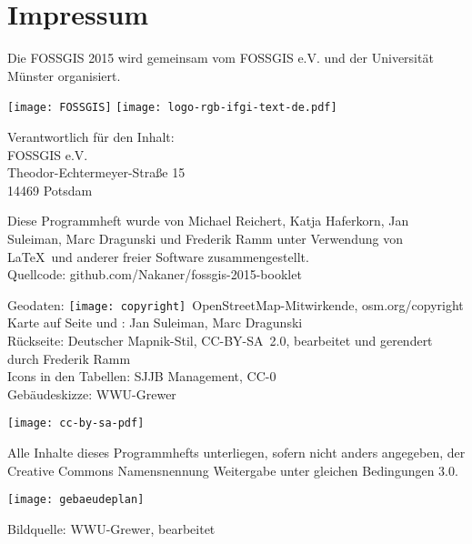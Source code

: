 
\newpage


\newpage
\section*{Impressum}
\label{impressum}
\vspace{-0.5em}


\RaggedRight
Die FOSSGIS 2015 wird gemeinsam vom FOSSGIS e.V. und der Universität Münster 
organisiert.

\vspace{0.5em}
	\texttt{[image: FOSSGIS]}
	\hfill
	\texttt{[image: logo-rgb-ifgi-text-de.pdf]}

\vspace{0.5em}
\noindent Verantwortlich für den Inhalt:\\
FOSSGIS e.V.\\
Theodor-Echtermeyer-Straße 15\\
14469 Potsdam

\vspace{0.5em}
\noindent Diese Programmheft wurde von Michael Reichert, Katja Haferkorn, 
Jan Suleiman, Marc Dragunski und Frederik Ramm unter Verwendung von \LaTeX\ und 
anderer freier Software zusammengestellt.\\
{\small Quellcode: github.com/Nakaner/fossgis-2015-booklet}

\vspace{0.5em}

{\small\noindent Geodaten: \texttt{[image: copyright]}~Open\-Street\-Map-Mitwirkende, osm.org/copyright\\
Karte auf Seite \pageref{inhaltsverzeichnis} und \pageref{karte}: Jan Suleiman, Marc Dragunski\\
Rückseite: Deutscher Mapnik-Stil, CC-BY-SA~2.0, bearbeitet und gerendert durch Frederik Ramm\\
Icons in den Tabellen: SJJB Management, CC-0\\
Gebäudeskizze: WWU-Grewer
}


\vspace{1em}
\noindent \begin{minipage}[htbp]{0.2\textwidth}
\noindent\texttt{[image: cc-by-sa-pdf]}
\end{minipage}
\hfill
\begin{minipage}[hbtp]{0.74\textwidth}\RaggedRight
Alle Inhalte dieses Programmhefts unterliegen, sofern nicht anders angegeben, 
der Creative Commons Namensnennung Weitergabe unter gleichen Bedingungen 3.0.
\end{minipage}



\begin{landscape}
	\label{gebaeudeplan}
	\texttt{[image: gebaeudeplan]}
	
	{\small Bildquelle: WWU-Grewer, bearbeitet}
\end{landscape}

